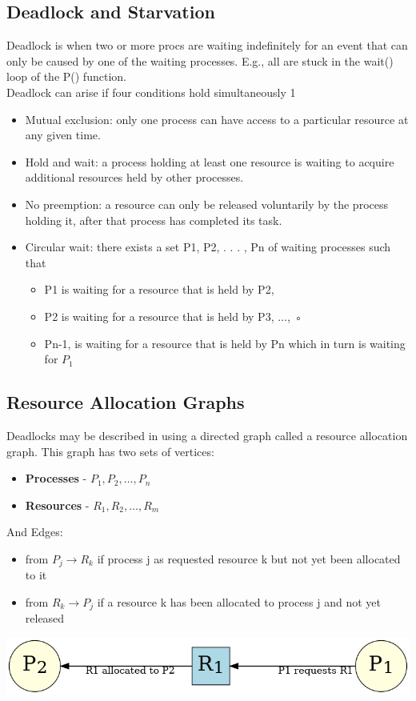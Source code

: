 \documentclass[a4paper, 10pt]{article}
\begin{document}
\subsection{Deadlock and Starvation}
Deadlock is when two or more procs are waiting indefinitely for an event that can only be caused by one of the waiting processes. E.g., all are stuck in the wait() loop of the P() function.\\[2ex]
Deadlock can arise if four conditions hold simultaneously 1
\begin{itemize}
    \item Mutual exclusion: only one process can have access to a particular resource at any given time.
    \item Hold and wait: a process holding at least one resource is waiting to acquire additional resources held by other processes.
    \item  No preemption: a resource can only be released voluntarily by the process holding it, after that process has completed its task.
    \item Circular wait: there exists a set {P1, P2, . . . , Pn} of waiting processes such that
          \begin{itemize}
              \item P1 is waiting for a resource that is held by P2,
              \item P2 is waiting for a resource that is held by P3, ..., ◦
              \item Pn-1, is waiting for a resource that is held by Pn which in turn is waiting for $P_1$
          \end{itemize}
\end{itemize}
\subsection{Resource Allocation Graphs}
Deadlocks may be described in using a directed graph called a resource allocation graph. This graph has two sets of vertices:
\begin{itemize}
    \item \textbf{Processes} - $P_1, P_2, \dots, P_n$
    \item \textbf{Resources} - $R_1, R_2, \dots, R_m$
\end{itemize}
And Edges:
\begin{itemize}
    \item from $P_j \to R_k$ if process j as requested resource k but not yet been allocated to it
    \item from $R_k \to P_j$ if a resource k has been allocated to process j and not yet released
\end{itemize}
\begin{center}
    \includegraphics[scale = 0.5]{images/resourceAllocationGraph.png}
\end{center}
\end{document}
